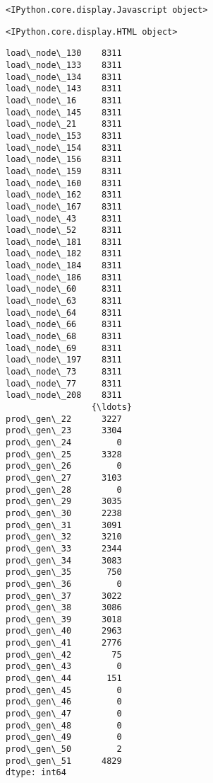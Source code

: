 \documentclass[11pt]{article}
\begin{document}
    
    \begin{verbatim}
<IPython.core.display.Javascript object>
    \end{verbatim}

    
    
    \begin{verbatim}
<IPython.core.display.HTML object>
    \end{verbatim}

    
    \begin{Verbatim}[commandchars=\\\{\}]
load\_node\_130    8311
load\_node\_133    8311
load\_node\_134    8311
load\_node\_143    8311
load\_node\_16     8311
load\_node\_145    8311
load\_node\_21     8311
load\_node\_153    8311
load\_node\_154    8311
load\_node\_156    8311
load\_node\_159    8311
load\_node\_160    8311
load\_node\_162    8311
load\_node\_167    8311
load\_node\_43     8311
load\_node\_52     8311
load\_node\_181    8311
load\_node\_182    8311
load\_node\_184    8311
load\_node\_186    8311
load\_node\_60     8311
load\_node\_63     8311
load\_node\_64     8311
load\_node\_66     8311
load\_node\_68     8311
load\_node\_69     8311
load\_node\_197    8311
load\_node\_73     8311
load\_node\_77     8311
load\_node\_208    8311
                 {\ldots} 
prod\_gen\_22      3227
prod\_gen\_23      3304
prod\_gen\_24         0
prod\_gen\_25      3328
prod\_gen\_26         0
prod\_gen\_27      3103
prod\_gen\_28         0
prod\_gen\_29      3035
prod\_gen\_30      2238
prod\_gen\_31      3091
prod\_gen\_32      3210
prod\_gen\_33      2344
prod\_gen\_34      3083
prod\_gen\_35       750
prod\_gen\_36         0
prod\_gen\_37      3022
prod\_gen\_38      3086
prod\_gen\_39      3018
prod\_gen\_40      2963
prod\_gen\_41      2776
prod\_gen\_42        75
prod\_gen\_43         0
prod\_gen\_44       151
prod\_gen\_45         0
prod\_gen\_46         0
prod\_gen\_47         0
prod\_gen\_48         0
prod\_gen\_49         0
prod\_gen\_50         2
prod\_gen\_51      4829
dtype: int64

    \end{Verbatim}
\end{document}
